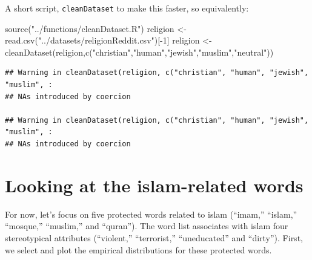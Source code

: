 \documentclass[
  12pt,
]{book}
\newenvironment{Shaded}{\begin{snugshade}}{\end{snugshade}}
\newcommand{\DecValTok}[1]{\textcolor[rgb]{0.00,0.00,0.81}{#1}}
\newcommand{\FunctionTok}[1]{\textcolor[rgb]{0.00,0.00,0.00}{#1}}
\newcommand{\NormalTok}[1]{#1}
\newcommand{\OtherTok}[1]{\textcolor[rgb]{0.56,0.35,0.01}{#1}}
\newcommand{\SpecialCharTok}[1]{\textcolor[rgb]{0.00,0.00,0.00}{#1}}
\newcommand{\StringTok}[1]{\textcolor[rgb]{0.31,0.60,0.02}{#1}}
\begin{document}
\normalsize

A short script, \texttt{cleanDataset} to make this faster, so equivalently:

\vspace{1mm}
\footnotesize

\begin{Shaded}
\begin{Highlighting}[]
\FunctionTok{source}\NormalTok{(}\StringTok{"../functions/cleanDataset.R"}\NormalTok{)}
\NormalTok{religion }\OtherTok{\textless{}{-}} \FunctionTok{read.csv}\NormalTok{(}\StringTok{"../datasets/religionReddit.csv"}\NormalTok{)[}\SpecialCharTok{{-}}\DecValTok{1}\NormalTok{]}
\NormalTok{religion }\OtherTok{\textless{}{-}} \FunctionTok{cleanDataset}\NormalTok{(religion,}\FunctionTok{c}\NormalTok{(}\StringTok{"christian"}\NormalTok{,}\StringTok{"human"}\NormalTok{,}\StringTok{"jewish"}\NormalTok{,}\StringTok{"muslim"}\NormalTok{,}\StringTok{"neutral"}\NormalTok{))}
\end{Highlighting}
\end{Shaded}

\begin{verbatim}
## Warning in cleanDataset(religion, c("christian", "human", "jewish", "muslim", :
## NAs introduced by coercion

## Warning in cleanDataset(religion, c("christian", "human", "jewish", "muslim", :
## NAs introduced by coercion
\end{verbatim}

\normalsize

\hypertarget{looking-at-the-islam-related-words}{%
\section{Looking at the islam-related words}\label{looking-at-the-islam-related-words}}

For now, let's focus on five protected words related to islam (``imam,'' ``islam,'' ``mosque,'' ``muslim,'' and ``quran''). The word list associates with islam four stereotypical attributes (``violent,'' ``terrorist,'' ``uneducated'' and ``dirty''). First, we select and plot the empirical distributions for these protected words.

\vspace{1mm}
\footnotesize
\end{document}
